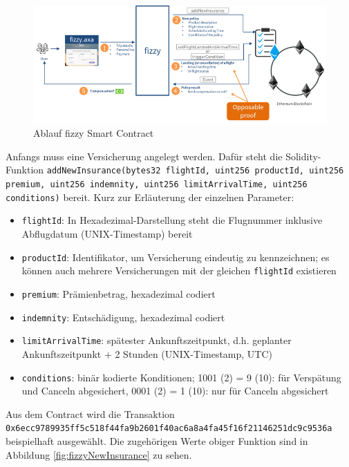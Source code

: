 \begin{figure}[h!]
  \centering
  \includegraphics[width=\textwidth]{Bilder/fizzyAblauf.png}
  \caption[Ablauf fizzy Smart Contract]{Ablauf fizzy Smart Contract \cite{Clement2019}}
  \label{fig:fizzyAblauf}
\end{figure}

Anfangs muss eine Versicherung angelegt werden. Dafür steht die Solidity-Funktion \texttt{addNewInsurance(bytes32 flightId, uint256 productId, uint256 premium, uint256 indemnity, uint256 limitArrivalTime, uint256 conditions)} bereit. Kurz zur Erläuterung der einzelnen Parameter:

\begin{itemize}
    \item \texttt{flightId}: In Hexadezimal-Darstellung steht die Flugnummer inklusive Abflugdatum (UNIX-Timestamp) bereit
    \item \texttt{productId}: Identifikator, um Versicherung eindeutig zu kennzeichnen; es können auch mehrere Versicherungen mit der gleichen \texttt{flightId} existieren
    \item \texttt{premium}: Prämienbetrag, hexadezimal codiert
    \item \texttt{indemnity}: Entschädigung, hexadezimal codiert
    \item \texttt{limitArrivalTime}: spätester Ankunftszeitpunkt, d.h. geplanter Ankunftszeitpunkt + 2 Stunden (UNIX-Timestamp, UTC)
    \item \texttt{conditions}: binär kodierte Konditionen; 1001 (2) = 9 (10): für Verspätung und Canceln abgesichert, 0001 (2) = 1 (10): nur für Canceln abgesichert
\end{itemize}

Aus dem Contract wird die Transaktion\\
\texttt{0x6ecc9789935ff5c518f44fa9b2601f40ac6a8a4fa45f16f21146251dc9c9536a} beispielhaft ausgewählt. Die zugehörigen Werte obiger Funktion sind in Abbildung \ref{fig:fizzyNewInsurance} zu sehen.

